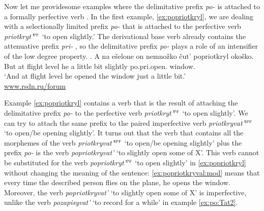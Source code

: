 Now let me providesome examples where the delimitative  prefix \textit{po-}   is attached to a formally perfective verb . In the first example, \ref{ex:popriotkryl}, we are dealing with a selectionally limited prefix  \textit{po-}   that is attached to the perfective verb  \textit{priotkryt'}$^{\textsc{pf}}$ `to open slightly.' The derivational base verb already contains the attenuative  prefix \textit{pri-} , so the delimitative  prefix \textit{po-}   plays a role of an intensifier of the low degree property. 
\exg. \label{ex:popriotkryl}A na e\v{s}elone on nemno\v{z}ko \v{c}ut' popriotkryl oko\v{s}ko.\\
But at {flight level} he {a little bit} {slightly} po.pri.open. window.\\
\trans `And at flight level he opened the window just a little bit.'\\\hbox{}\hfill\hbox{\url{www.rsdn.ru/forum}}

Example \ref{ex:popriotkryl} contains a verb that is the result of attaching the delimitative  prefix \textit{po-}   to the perfective verb  \textit{priotkryt'}$^{\textsc{pf}}$ `to open slightly'. We can try to attach the same prefix to the paired imperfective verb  \textit{priotkryvat'}$^{\textsc{ipf}}$ `to open/be opening slightly'. It turns out that the verb that contains all the morphemes of the verb \textit{priotkryvat'}$^{\textsc{ipf}}$ `to open/be opening slightly' plus the prefix \textit{po-}   is the verb \textit{popriotkryvat'} `to slightly open some of X'. This verb cannot be substituted for the verb \textit{popriotkryt'}$^{\textsc{pf}}$ `to open slightly' in \ref{ex:popriotkryl} without changing the meaning of the sentence: \ref{ex:popriotkryval:mod} means that every time the described person flies on the plane, he opens the window. Moreover, the verb \textit{popriotkryvat'} `to slightly open some of X' is imperfective, unlike the verb \textit{pozapisyvat'} `to record for a while' in example \ref{ex:po:Tat2}.

